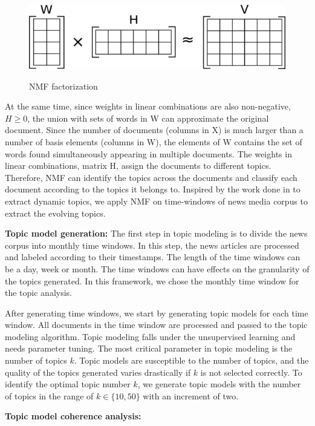 \begin{figure}[t]
\centering
\includegraphics[scale=.4]{img/NMF}
\label{fig:NMF}
\caption{NMF factorization}
\end{figure}

At the same time, since weights in linear combinations are also non-negative, $H \geq 0$, the union with sets of words in W can approximate the original document. Since the number of documents (columns in X) is much larger than a number of basis elements (columns in W), the elements of W contains the set of words found simultaneously appearing in multiple documents. The weights in linear combinations, matrix H, assign the documents to different topics. Therefore, NMF  can identify the topics across the documents and classify each document according to the topics it belongs to. Inspired by the work done in \cite{Greene2016} to extract dynamic topics, we apply NMF on time-windows of news media corpus to extract the evolving topics.

\textbf{Topic model generation:}
The first step in topic modeling is to divide the news corpus into monthly time windows. In this step, the news articles are processed and labeled according to their timestamps. The length of the time windows can be a day, week or month. The time windows can have effects on the granularity of the topics generated. In this framework, we chose the monthly time window for the topic analysis. 

After generating time windows, we start by generating topic models for each time window. All documents in the time window are processed and passed to the topic modeling algorithm. Topic modeling falls under the unsupervised learning and needs parameter tuning. The most critical parameter in topic modeling is the number of topics $k$. Topic models are susceptible to the number of topics, and the quality of the topics generated varies drastically if $k$ is not selected correctly. To identify the optimal topic number $k$, we generate topic models with the number of topics in the range of $k \in \{10, 50\}$ with an increment of two.




\textbf{Topic model coherence analysis:}

